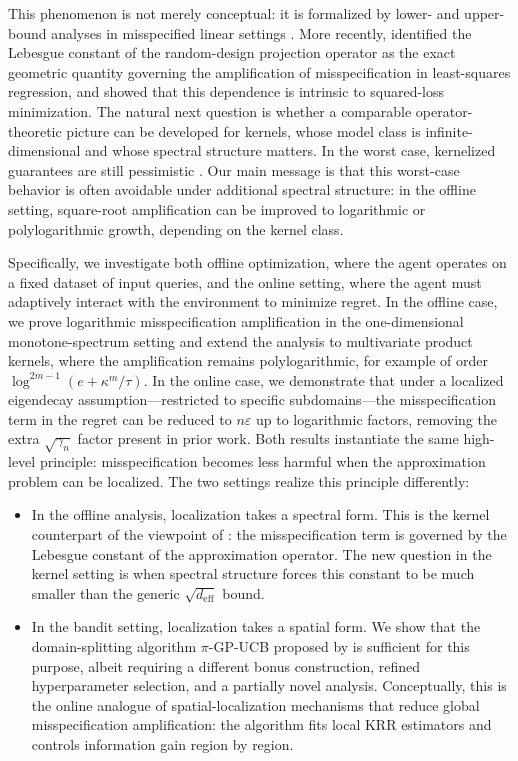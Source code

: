 \documentclass{article}
\let\cite\citep
\numberwithin{theorem}{section}
\theoremstyle{definition}
\begin{document}
This phenomenon is not merely conceptual: it is formalized by lower- and upper-bound analyses in misspecified linear settings \cite{du2020good,lattimore2020learning}. More recently, \cite{maran2025beyond} identified the Lebesgue constant of the random-design projection operator as the exact geometric quantity governing the amplification of misspecification in least-squares regression, and showed that this dependence is intrinsic to squared-loss minimization. The natural next question is whether a comparable operator-theoretic picture can be developed for kernels, whose model class is infinite-dimensional and whose spectral structure matters. In the worst case, kernelized guarantees are still pessimistic \cite{bogunovic2021misspecified}. Our main message is that this worst-case behavior is often avoidable under additional spectral structure: in the offline setting, square-root amplification can be improved to logarithmic or polylogarithmic growth, depending on the kernel class.

Specifically, we investigate both offline optimization, where the agent operates on a fixed dataset of input queries, and the online setting, where the agent must adaptively interact with the environment to minimize regret. In the offline case, we prove logarithmic misspecification amplification in the one-dimensional monotone-spectrum setting and extend the analysis to multivariate product kernels, where the amplification remains polylogarithmic, for example of order $\log^{2m-1}(e+\kappa^m/\tau)$. In the online case, we demonstrate that under a localized eigendecay assumption—restricted to specific subdomains—the misspecification term in the regret can be reduced to $n\varepsilon$ up to logarithmic factors, removing the extra $\sqrt{\gamma_n}$ factor present in prior work. Both results instantiate the same high-level principle: misspecification becomes less harmful when the approximation problem can be localized. The two settings realize this principle differently:
\begin{itemize}
    \item In the offline analysis, localization takes a spectral form. This is the kernel counterpart of the viewpoint of \cite{maran2025beyond}: the misspecification term is governed by the Lebesgue constant of the approximation operator. The new question in the kernel setting is when spectral structure forces this constant to be much smaller than the generic $\sqrt{d_\text{eff}}$ bound.
    \item In the bandit setting, localization takes a spatial form. We show that the domain-splitting algorithm $\pi$-\textsc{GP-UCB} proposed by \cite{janz2020bandit} is sufficient for this purpose, albeit requiring a different bonus construction, refined hyperparameter selection, and a partially novel analysis. Conceptually, this is the online analogue of spatial-localization mechanisms that reduce global misspecification amplification: the algorithm fits local KRR estimators and controls information gain region by region.
\end{itemize}
\end{document}
